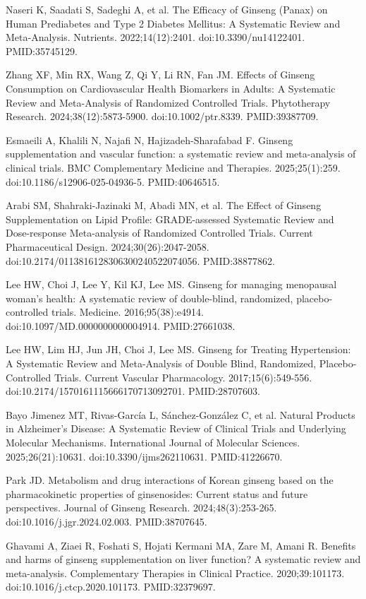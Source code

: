 \documentclass[12pt,oneside]{book}
\newcommand{\reff}[2]{\par\hangindent=7mm\hangafter=1\noindent[#1]\hspace{2mm}#2\par}
\begin{document}
\reff{52}{Naseri K, Saadati S, Sadeghi A, et al. The Efficacy of Ginseng (Panax) on Human Prediabetes and Type 2 Diabetes Mellitus: A Systematic Review and Meta-Analysis. Nutrients. 2022;14(12):2401. doi:10.3390/nu14122401. PMID:35745129.}

\reff{53}{Zhang XF, Min RX, Wang Z, Qi Y, Li RN, Fan JM. Effects of Ginseng Consumption on Cardiovascular Health Biomarkers in Adults: A Systematic Review and Meta-Analysis of Randomized Controlled Trials. Phytotherapy Research. 2024;38(12):5873-5900. doi:10.1002/ptr.8339. PMID:39387709.}

\reff{54}{Esmaeili A, Khalili N, Najafi N, Hajizadeh-Sharafabad F. Ginseng supplementation and vascular function: a systematic review and meta-analysis of clinical trials. BMC Complementary Medicine and Therapies. 2025;25(1):259. doi:10.1186/s12906-025-04936-5. PMID:40646515.}

\reff{55}{Arabi SM, Shahraki-Jazinaki M, Abadi MN, et al. The Effect of Ginseng Supplementation on Lipid Profile: GRADE-assessed Systematic Review and Dose-response Meta-analysis of Randomized Controlled Trials. Current Pharmaceutical Design. 2024;30(26):2047-2058. doi:10.2174/0113816128306300240522074056. PMID:38877862.}

\reff{56}{Lee HW, Choi J, Lee Y, Kil KJ, Lee MS. Ginseng for managing menopausal woman's health: A systematic review of double-blind, randomized, placebo-controlled trials. Medicine. 2016;95(38):e4914. doi:10.1097/MD.0000000000004914. PMID:27661038.}

\reff{57}{Lee HW, Lim HJ, Jun JH, Choi J, Lee MS. Ginseng for Treating Hypertension: A Systematic Review and Meta-Analysis of Double Blind, Randomized, Placebo-Controlled Trials. Current Vascular Pharmacology. 2017;15(6):549-556. doi:10.2174/1570161115666170713092701. PMID:28707603.}

\reff{58}{Bayo Jimenez MT, Rivas-García L, Sánchez-González C, et al. Natural Products in Alzheimer's Disease: A Systematic Review of Clinical Trials and Underlying Molecular Mechanisms. International Journal of Molecular Sciences. 2025;26(21):10631. doi:10.3390/ijms262110631. PMID:41226670.}

\reff{59}{Park JD. Metabolism and drug interactions of Korean ginseng based on the pharmacokinetic properties of ginsenosides: Current status and future perspectives. Journal of Ginseng Research. 2024;48(3):253-265. doi:10.1016/j.jgr.2024.02.003. PMID:38707645.}

\reff{60}{Ghavami A, Ziaei R, Foshati S, Hojati Kermani MA, Zare M, Amani R. Benefits and harms of ginseng supplementation on liver function? A systematic review and meta-analysis. Complementary Therapies in Clinical Practice. 2020;39:101173. doi:10.1016/j.ctcp.2020.101173. PMID:32379697.}
\end{document}
